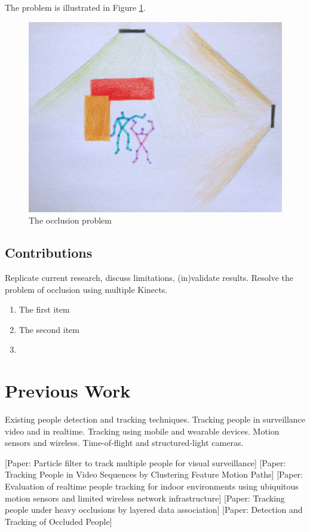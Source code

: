 \documentclass{sigchi}
\begin{document}
The problem is illustrated in Figure \ref{fig:occlusion_problem}.

\begin{figure}
  \centering
  \includegraphics[width=0.9\columnwidth]{occlusion_problem}
  \caption{The occlusion problem}
  \label{fig:occlusion_problem}
\end{figure}

\subsection{Contributions}

Replicate current research, discuss limitations, (in)validate results. Resolve the problem of occlusion using multiple Kinects. 

\begin{enumerate}
  \item The first item
  \item The second item
  \item 
\end{enumerate}

\section{Previous Work}

Existing people detection and tracking techniques. Tracking people in surveillance video and in realtime. Tracking using mobile and wearable devices. Motion sensors and wireless. Time-of-flight and structured-light cameras.

[Paper: Particle filter to track multiple people for visual surveillance]
[Paper: Tracking People in Video Sequences by Clustering Feature Motion Paths]
[Paper: Evaluation of realtime people tracking for indoor environments using ubiquitous motion sensors and limited wireless network infrastructure]
[Paper: Tracking people under heavy occlusions by layered data association]
[Paper: Detection and Tracking of Occluded People]
\end{document}
